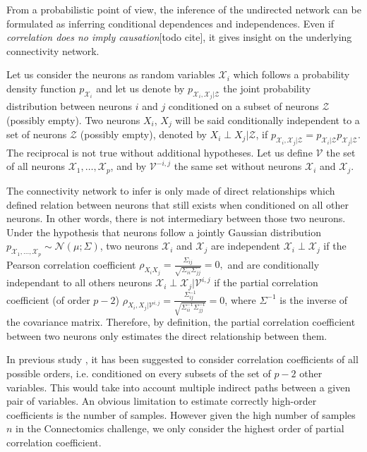 \documentclass[wcp]{jmlr}
\begin{document}
From a probabilistic point of view, the inference of the undirected network
can be formulated as inferring conditional dependences and independences. Even
if \textit{correlation does no imply causation}[todo cite], it gives insight
on the underlying connectivity network.

Let us consider the neurons as random variables $\mathcal{X}_i$ which follows
a probability density function $p_{\mathcal{X}_i}$ and let us denote by
$p_{\mathcal{X}_i,\mathcal{X}_j|\mathcal{Z}}$ the joint probability
distribution between neurons $i$ and $j$ conditioned on a subset of neurons
$\mathcal{Z}$ (possibly empty). Two neurons $X_i$, $X_j$
will be said conditionally independent to a set of neurons
$\mathcal{Z}$ (possibly empty), denoted by  $X_i \perp X_j | \mathcal{Z}$,  if
$p_{\mathcal{X}_i,\mathcal{X}_j|\mathcal{Z}} = p_{\mathcal{X}_i|\mathcal{Z}}
p_{\mathcal{X}_j|\mathcal{Z}}$. The reciprocal is not true without
additional hypotheses.  Let us define $\mathcal{V}$ the set of all
neurons $\mathcal{X}_1, \dots, \mathcal{X}_p$, and by $\mathcal{V}^{-i,j}$ the
same set without neurons $\mathcal{X}_i$ and $\mathcal{X}_j$.

The connectivity network to infer is only made of direct relationships
which defined relation between neurons that still exists when
conditioned on all other neurons. In other words, there is not intermediary
between those two neurons. Under the hypothesis that neurons follow a jointly
Gaussian distribution $p_{\mathcal{X}_1, \dots, \mathcal{X}_p} \sim
\mathcal{N}(\mu; \Sigma)$, two neurons $\mathcal{X}_i$ and $\mathcal{X}_j$ are
independent $\mathcal{X}_i\perp \mathcal{X}_j$ if the Pearson correlation
coefficient $\rho_{X_iX_j} = \frac{\Sigma_{ij}}{\sqrt{\Sigma_{ii}
\Sigma_{jj}}} = 0,$ and are conditionally independant to all others neurons
$\mathcal{X}_i \perp \mathcal{X}_j |\mathcal{V}^{i,j}$ if the partial
correlation coefficient (of order $p-2$) $\rho_{X_i, X_j | \mathcal{V}^{i,j}}
= \frac{\Sigma^{-1}_{ij}}{\sqrt{\Sigma^{-1}_{ii} \Sigma^{-1}_{jj}}} = 0$,
where $\Sigma^{-1}$ is the inverse of the covariance matrix.
Therefore, by definition, the partial correlation coefficient between two
neurons only estimates the direct relationship between them.

In previous study \cite{shipley2002cause}, it has been suggested to
consider correlation coefficients of all possible orders,
i.e. conditioned on every subsets of the set of $p-2$ other variables. This
would take into account multiple indirect paths between a given pair of
variables. An obvious limitation to estimate correctly high-order coefficients
is the number of samples. However given the high number of samples $n$
in the Connectomics challenge, we only consider the highest order of partial
correlation coefficient.
\end{document}
